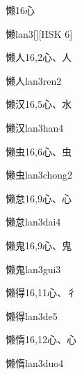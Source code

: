 \begin{entry}{懒}{16}{⼼}
  \begin{phonetics}{懒}{lan3}[][HSK 6]
  \end{phonetics}
\end{entry}

\begin{entry}{懒人}{16,2}{⼼、⼈}
  \begin{phonetics}{懒人}{lan3ren2}
  \end{phonetics}
\end{entry}

\begin{entry}{懒汉}{16,5}{⼼、⽔}
  \begin{phonetics}{懒汉}{lan3han4}
  \end{phonetics}
\end{entry}

\begin{entry}{懒虫}{16,6}{⼼、⾍}
  \begin{phonetics}{懒虫}{lan3chong2}
  \end{phonetics}
\end{entry}

\begin{entry}{懒怠}{16,9}{⼼、⼼}
  \begin{phonetics}{懒怠}{lan3dai4}
  \end{phonetics}
\end{entry}

\begin{entry}{懒鬼}{16,9}{⼼、⿁}
  \begin{phonetics}{懒鬼}{lan3gui3}
  \end{phonetics}
\end{entry}

\begin{entry}{懒得}{16,11}{⼼、⼻}
  \begin{phonetics}{懒得}{lan3de5}
  \end{phonetics}
\end{entry}

\begin{entry}{懒惰}{16,12}{⼼、⼼}
  \begin{phonetics}{懒惰}{lan3duo4}
  \end{phonetics}
\end{entry}

